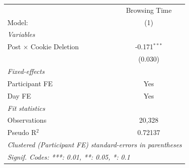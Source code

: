 \begin{tabular}{lc}
   \tabularnewline \midrule \midrule
                                  & Browsing Time \\   
   Model:                         & (1)\\  
   \midrule
   \emph{Variables}\\
   Post $\times$ Cookie Deletion  & -0.171$^{***}$\\   
                                  & (0.030)\\   
   \midrule
   \emph{Fixed-effects}\\
   Participant FE                 & Yes\\  
   Day FE                         & Yes\\  
   \midrule
   \emph{Fit statistics}\\
   Observations                   & 20,328\\  
   Pseudo R$^2$                   & 0.72137\\  
   \midrule \midrule
   \multicolumn{2}{l}{\emph{Clustered (Participant FE) standard-errors in parentheses}}\\
   \multicolumn{2}{l}{\emph{Signif. Codes: ***: 0.01, **: 0.05, *: 0.1}}\\
\end{tabular}
